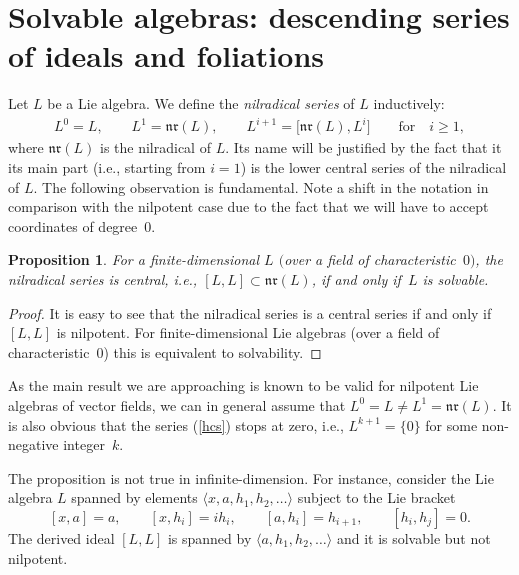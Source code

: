 \documentclass[11pt]{article}
\numberwithin{equation}{section}
\numberwithin{equation}{section}
\newtheorem{Proposition}[Theorem]{Proposition}
 { \theoremstyle{definition}
\newtheorem{Definition}[Theorem]{Definition}
\newtheorem{Example}[Theorem]{Example}
\newtheorem{Remark}[Theorem]{Remark} }
\begin{document}
\section{Solvable algebras: descending series of ideals and foliations}
Let $L$ be a Lie algebra. We define the \emph{nilradical series} of $L$ inductively:
\begin{gather}\label{hcs} L^0=L ,\qquad L^1=\mathfrak{nr}(L) , \qquad L^{i+1}=\big[\mathfrak{nr}(L),L^i\big]\qquad \text{for}\quad i\ge 1 ,
\end{gather}
where $\mathfrak{nr}(L)$ is the nilradical of $L$.
Its name will be justified by the fact that it its main part (i.e., starting from $i=1$) is the lower central series of the nilradical of $L$. The following observation is fundamental. Note a shift in the notation in comparison with the nilpotent case due to the fact that we will have to accept coordinates of degree~$0$.
\begin{Proposition}
For a finite-dimensional $L$ $($over a field of characteristic~$0)$, the nilradical series is central, i.e., $[L,L]\subset\mathfrak{nr}(L)$, if and only if~$L$ is solvable.
\end{Proposition}
\begin{proof}
It is easy to see that the nilradical series is a central series if and only if $[L,L]$ is nilpotent. For finite-dimensional Lie algebras (over a field of characteristic~$0$) this is equivalent to solvability.
\end{proof}
\begin{Remark}
As the main result we are approaching is known to be valid for nilpotent Lie algebras of vector fields, we can in general assume that $L^0=L\ne L^1=\mathfrak{nr}(L)$. It is also obvious that the series (\ref{hcs}) stops at zero, i.e., $L^{k+1}=\{ 0\}$ for some non-negative integer~$k$.
\end{Remark}
\begin{Example} The proposition is not true in infinite-dimension. For instance, consider the Lie algebra $L$ spanned by elements $\langle x,a,h_1,h_2,\dots\rangle$ subject to the Lie bracket
\[ [x,a]=a ,\qquad [x,h_i]=ih_i ,\qquad [a,h_i]=h_{i+1} ,\qquad [h_i,h_j]=0 .\]
The derived ideal $[L,L]$ is spanned by $\langle a,h_1,h_2,\dots\rangle$ and it is solvable but not nilpotent.
\end{Example}
\end{document}
